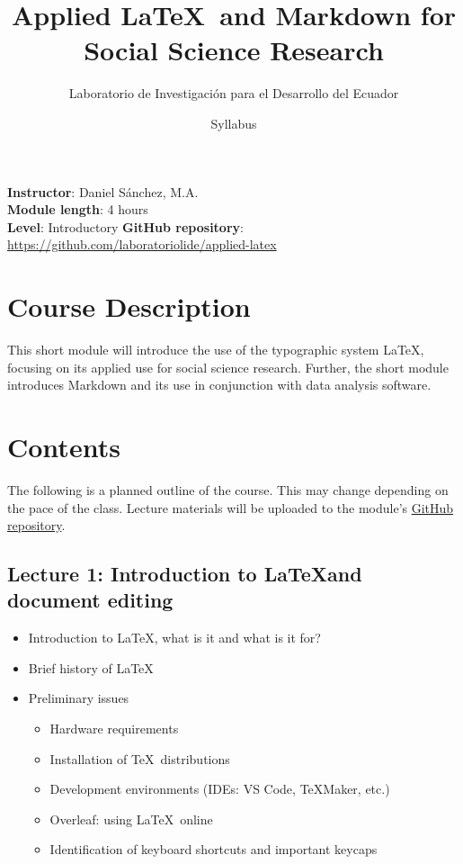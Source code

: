\documentclass[a4paper,12pt]{article}
\title{Applied \LaTeX \ and Markdown for Social Science Research}
\author{Laboratorio de Investigación para el Desarrollo del Ecuador}
\date{Syllabus}
\begin{document}
\maketitle

\noindent \textbf{Instructor}: Daniel Sánchez, M.A. \\
\textbf{Module length}: 4 hours \\
\textbf{Level}: Introductory
\textbf{GitHub repository}: \url{https://github.com/laboratoriolide/applied-latex}

\section{Course Description}

This short module will introduce the use of the typographic system \LaTeX, focusing on its applied use for social science research. Further, the short module introduces Markdown and its use in conjunction with data analysis software. 

\section{Contents}

The following is a planned outline of the course. This may change depending on the pace of the
class. Lecture materials will be uploaded to the module's \href{https://github.com/laboratoriolide/applied-latex}{GitHub repository}.

\subsection{Lecture 1: Introduction to \LaTeX and document editing}

\begin{itemize}
    \item Introduction to \LaTeX, what is it and what is it for?
    \item Brief history of \LaTeX
    \item Preliminary issues
    \begin{itemize}
        \item Hardware requirements
        \item Installation of \TeX \ distributions
        \item Development environments (IDEs: VS Code, \TeX Maker, etc.)
        \item Overleaf: using \LaTeX \ online
        \item Identification of keyboard shortcuts and important keycaps
    \end{itemize}
\end{itemize}
\end{document}
